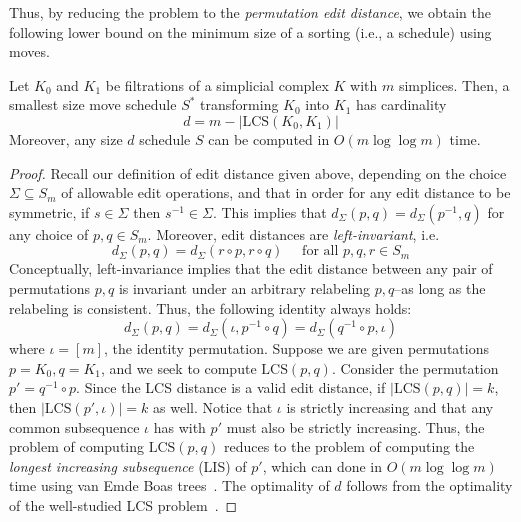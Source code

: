 \documentclass{siamart190516}
\begin{document}
%
Thus, by reducing the problem to the \emph{permutation edit distance}, we obtain the following lower bound on the minimum size of a sorting (i.e., a schedule) using moves. 
\begin{proposition}
Let $K_0$ and $ K_1$ be filtrations of a simplicial complex $K$ with  $m$ simplices.
Then, a smallest size  move schedule $S^*$ transforming $K_0$ into $K_1$ has cardinality 
$$ d = m - \lvert \mathrm{LCS}(K_0, K_1) \rvert $$ 
Moreover, any size $d$ schedule $S$ can be computed in $O(m \log \log m)$ time. 
\end{proposition}
\begin{proof}
Recall our definition of  edit distance given above, 
depending on the choice   $\Sigma \subseteq S_m$ of allowable edit operations, and that in order for any edit distance to be symmetric, if $s \in \Sigma$ then $s^{-1} \in \Sigma$. This implies that $d_\Sigma(p,q) = d_\Sigma(p^{-1}, q)$ for any choice of  $p,q \in S_m$. 
Moreover, edit distances are \emph{left-invariant}, i.e.
\[
d_\Sigma(p,q) = d_\Sigma(r \circ p, r \circ q) \quad \text{ for all } p,q,r \in S_m
\]
Conceptually, left-invariance implies that the edit distance between any pair of permutations $p,q$ is invariant under an arbitrary relabeling $p,q$--as long as the relabeling is consistent. Thus, the following identity always holds: 
$$ d_\Sigma(p,q) = d_\Sigma(\iota, p^{-1} \circ q) = d_\Sigma(q^{-1} \circ p, \iota) $$
where $\iota = [m]$, the identity permutation. Suppose we are given permutations $p = K_0, q = K_1$, and we seek to compute $\mathrm{LCS}(p, q)$. Consider the permutation $p' = q^{-1} \circ p$. Since the LCS distance is a valid edit distance, if $\lvert \mathrm{LCS}(p, q) \rvert = k$, then $\lvert \mathrm{LCS}(p', \iota) \rvert = k$ as well. Notice that $\iota$ is strictly increasing and that any common subsequence $\iota$ has with $p'$ must also be strictly increasing. Thus, the problem of computing $\mathrm{LCS}(p, q)$ reduces to the problem of computing the \emph{longest increasing subsequence} (LIS) of $p'$, which can done in $O( m \log \log m)$ time using van Emde Boas trees~\cite{bespamyatnikh2000enumerating}. The optimality of $d$ follows from the optimality of the well-studied LCS problem~\cite{kumar1987linear}. 
\end{proof}
\end{document}
